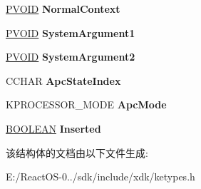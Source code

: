 \begin{DoxyCompactItemize}
\hyperlink{interfacevoid}{P\+V\+O\+ID} {\bfseries Normal\+Context}
\item 
\mbox{\label{struct___k_a_p_c_a375f784f0fbe6bcab5b6791be8ffa7e8}} 
\hyperlink{interfacevoid}{P\+V\+O\+ID} {\bfseries System\+Argument1}
\item 
\mbox{\label{struct___k_a_p_c_aa4fbf857c86b10f74f60f4f1845dde54}} 
\hyperlink{interfacevoid}{P\+V\+O\+ID} {\bfseries System\+Argument2}
\item 
\mbox{\label{struct___k_a_p_c_a541afd3606fea5a0f6a4a11e71117c29}} 
C\+C\+H\+AR {\bfseries Apc\+State\+Index}
\item 
\mbox{\label{struct___k_a_p_c_a0f08a5eedec1c47bf7ab0bfbda515a34}} 
K\+P\+R\+O\+C\+E\+S\+S\+O\+R\+\_\+\+M\+O\+DE {\bfseries Apc\+Mode}
\item 
\mbox{\label{struct___k_a_p_c_a286d1660639cfd825395565f81f7c3e0}} 
\hyperlink{_processor_bind_8h_a112e3146cb38b6ee95e64d85842e380a}{B\+O\+O\+L\+E\+AN} {\bfseries Inserted}
\end{DoxyCompactItemize}


该结构体的文档由以下文件生成\+:\begin{DoxyCompactItemize}
\item 
E\+:/\+React\+O\+S-\/0../sdk/include/xdk/ketypes.\+h\end{DoxyCompactItemize}
